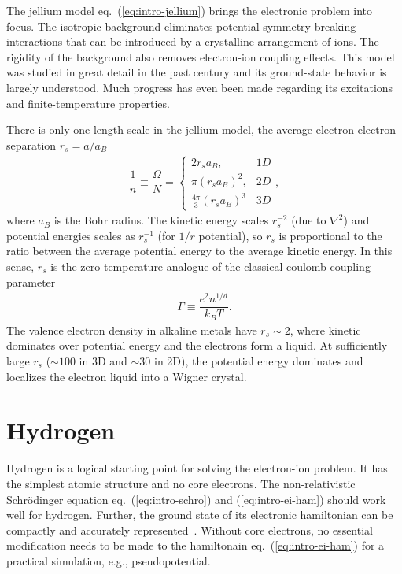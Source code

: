 The jellium model eq.~(\ref{eq:intro-jellium}) brings the electronic problem into focus. The isotropic background eliminates potential symmetry breaking interactions that can be introduced by a crystalline arrangement of ions. The rigidity of the background also removes electron-ion coupling effects. This model was studied in great detail in the past century and its ground-state behavior is largely understood. Much progress has even been made regarding its excitations and finite-temperature properties.

There is only one length scale in the jellium model, the average electron-electron separation $r_s=a/a_B$
\begin{align}
\dfrac{1}{n} \equiv \dfrac{\Omega}{N} = \left\{\begin{array}{lr}
2 r_s a_B, & 1D\\
\pi(r_sa_B)^2, & 2D\\
\frac{4\pi}{3}(r_sa_B)^3 & 3D
\end{array}\right.,
\end{align}
where $a_B$ is the Bohr radius. The kinetic energy scales $r_s^{-2}$ (due to $\nabla^2$) and potential energies scales as $r_s^{-1}$ (for $1/r$ potential), so $r_s$ is proportional to the ratio between the average potential energy to the average kinetic energy. In this sense, $r_s$ is the zero-temperature analogue of the classical coulomb coupling parameter
\begin{align}
\Gamma \equiv \dfrac{e^2n^{1/d}}{k_BT}.
\end{align}
The valence electron density in alkaline metals have $r_s\sim2$, where kinetic dominates over potential energy and the electrons form a liquid. At sufficiently large $r_s$ ($\sim 100$ in 3D and $\sim 30$ in 2D), the potential energy dominates and localizes the electron liquid into a Wigner crystal.

\section{Hydrogen}
Hydrogen is a logical starting point for solving the electron-ion problem.
It has the simplest atomic structure and no core electrons.
The non-relativistic Schr\"odinger equation eq.~(\ref{eq:intro-schro}) and (\ref{eq:intro-ei-ham}) should work well for hydrogen. Further, the ground state of its electronic hamiltonian can be compactly and accurately represented~\cite{Holzmann2003}.
Without core electrons, no essential modification needs to be made to the hamiltonain eq.~(\ref{eq:intro-ei-ham}) for a practical simulation, e.g., pseudopotential.

